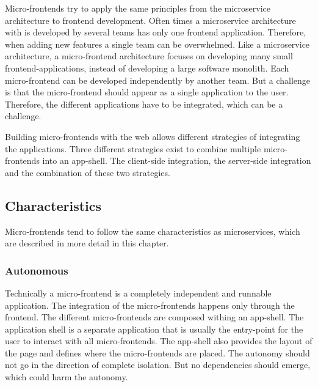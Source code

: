 \bigskip

\noindent Micro-frontends try to apply the same principles from the microservice architecture to frontend development. Often times a microservice architecture with is developed by several teams has only one frontend application. Therefore, when adding new features a single team can be overwhelmed. Like a microservice architecture, a micro-frontend architecture focuses on developing many small frontend-applications, instead of developing a large software monolith. Each micro-frontend can be developed independently by another team. But a challenge is that the micro-frontend should appear as a single application to the user. Therefore, the different applications have to be integrated, which can be a challenge.

\bigskip

\noindent Building micro-frontends with the web allows different strategies of integrating the applications. Three different strategies exist to combine multiple micro-frontends into an app-shell. The client-side integration, the server-side integration and the combination of these two strategies. \cite[10-12]{book:2020:geers:background:micro-frontends:micro-frontends-in-action}

\subsection{Characteristics}

Micro-frontends tend to follow the same characteristics as microservices, which are described in more detail in this chapter.

\subsubsection{Autonomous}

Technically a micro-frontend is a completely independent and runnable application. The integration of the micro-frontends happens only through the frontend. The different micro-frontends are composed withing an app-shell. The application shell is a separate application that is usually the entry-point for the user to interact with all micro-frontends. The app-shell also provides the layout of the page and defines where the micro-frontends are placed. The autonomy should not go in the direction of complete isolation. But no dependencies should emerge, which could harm the autonomy. \cite{book:2020:geers:background:micro-frontends:micro-frontends-in-action}

